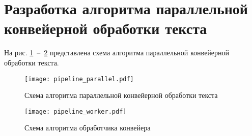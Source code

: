 \newpage

\section{Разработка алгоритма параллельной конвейерной обработки текста}
На рис. \ref{img:alg4}~--~\ref{img:alg5} представлена схема алгоритма параллельной конвейерной обработки текста.

\begin{figure}[h!]
\centering
    \texttt{[image: pipeline\_parallel.pdf]}
    \caption{Схема алгоритма параллельной конвейерной обработки текста}
    \label{img:alg4}	
\end{figure}

\begin{figure}[h!]
\centering
    \texttt{[image: pipeline\_worker.pdf]}
    \caption{Схема алгоритма обработчика конвейера}
    \label{img:alg5}	
\end{figure}

\newpage


\newpage